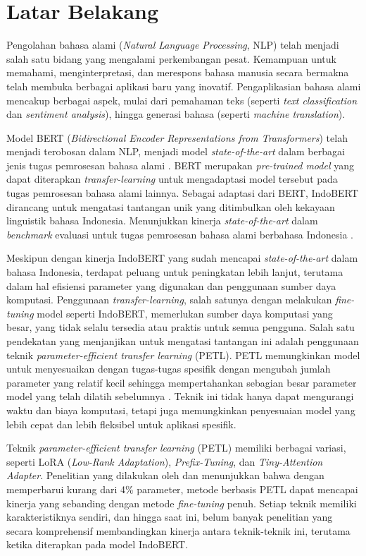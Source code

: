 \section{Latar Belakang}
\label{sec:latar-belakang}

Pengolahan bahasa alami (\textit{Natural Language Processing}, NLP) telah menjadi salah satu bidang yang mengalami perkembangan pesat. Kemampuan untuk memahami, menginterpretasi, dan merespons bahasa manusia secara bermakna telah membuka berbagai aplikasi baru yang inovatif. Pengaplikasian bahasa alami mencakup berbagai aspek, mulai dari pemahaman teks (seperti \textit{text classification} dan \textit{sentiment analysis}), hingga generasi bahasa (seperti \textit{machine translation}).

Model BERT (\textit{Bidirectional Encoder Representations from Transformers}) telah menjadi terobosan dalam NLP, menjadi model \textit{state-of-the-art} dalam berbagai jenis tugas pemrosesan bahasa alami \parencite{bert}. BERT merupakan \textit{pre-trained model} yang dapat diterapkan \textit{transfer-learning} untuk mengadaptasi model tersebut pada tugas pemrosesan bahasa alami lainnya. Sebagai adaptasi dari BERT, IndoBERT dirancang untuk mengatasi tantangan unik yang ditimbulkan oleh kekayaan linguistik bahasa Indonesia. Menunjukkan kinerja \textit{state-of-the-art} dalam \textit{benchmark} evaluasi untuk tugas pemrosesan bahasa alami berbahasa Indonesia \parencite{indobert}.

Meskipun dengan kinerja IndoBERT yang sudah mencapai \textit{state-of-the-art} dalam bahasa Indonesia, terdapat peluang untuk peningkatan lebih lanjut, terutama dalam hal efisiensi parameter yang digunakan dan penggunaan sumber daya komputasi. Penggunaan \textit{transfer-learning}, salah satunya dengan melakukan \textit{fine-tuning} model seperti IndoBERT, memerlukan sumber daya komputasi yang besar, yang tidak selalu tersedia atau praktis untuk semua pengguna. Salah satu pendekatan yang menjanjikan untuk mengatasi tantangan ini adalah penggunaan teknik \textit{parameter-efficient transfer learning} (PETL). PETL memungkinkan model untuk menyesuaikan dengan tugas-tugas spesifik dengan mengubah jumlah parameter yang relatif kecil sehingga mempertahankan sebagian besar parameter model yang telah dilatih sebelumnya \parencite{adapter}. Teknik ini tidak hanya dapat mengurangi waktu dan biaya komputasi, tetapi juga memungkinkan penyesuaian model yang lebih cepat dan lebih fleksibel untuk aplikasi spesifik. 

Teknik \textit{parameter-efficient transfer learning} (PETL) memiliki berbagai variasi, seperti LoRA (\textit{Low-Rank Adaptation}), \textit{Prefix-Tuning}, dan \textit{Tiny-Attention Adapter}. Penelitian yang dilakukan oleh \citeauthor{adapter} \parencite{adapter} dan \citeauthor{uvpl} \parencite{uvpl} menunjukkan bahwa dengan memperbarui kurang dari 4\% parameter, metode berbasis PETL dapat mencapai kinerja yang sebanding dengan metode \textit{fine-tuning} penuh. Setiap teknik memiliki karakteristiknya sendiri, dan hingga saat ini, belum banyak penelitian yang secara komprehensif membandingkan kinerja antara teknik-teknik ini, terutama ketika diterapkan pada model IndoBERT. 

